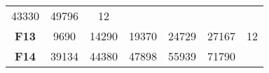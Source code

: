 \documentclass[12pt,a4paper]{article}
\begin{document}
\begin{longtable}[c]{@{}ccccccc@{}}
\begin{minipage}[t]{0.10\columnwidth}\centering\strut
43330
\strut\end{minipage} &
\begin{minipage}[t]{0.11\columnwidth}\centering\strut
49796
\strut\end{minipage} &
\begin{minipage}[t]{0.07\columnwidth}\centering\strut
12
\strut\end{minipage}\tabularnewline
\begin{minipage}[t]{0.11\columnwidth}\centering\strut
\textbf{F13}
\strut\end{minipage} &
\begin{minipage}[t]{0.08\columnwidth}\centering\strut
9690
\strut\end{minipage} &
\begin{minipage}[t]{0.08\columnwidth}\centering\strut
14290
\strut\end{minipage} &
\begin{minipage}[t]{0.09\columnwidth}\centering\strut
19370
\strut\end{minipage} &
\begin{minipage}[t]{0.10\columnwidth}\centering\strut
24729
\strut\end{minipage} &
\begin{minipage}[t]{0.11\columnwidth}\centering\strut
27167
\strut\end{minipage} &
\begin{minipage}[t]{0.07\columnwidth}\centering\strut
12
\strut\end{minipage}\tabularnewline
\begin{minipage}[t]{0.11\columnwidth}\centering\strut
\textbf{F14}
\strut\end{minipage} &
\begin{minipage}[t]{0.08\columnwidth}\centering\strut
39134
\strut\end{minipage} &
\begin{minipage}[t]{0.08\columnwidth}\centering\strut
44380
\strut\end{minipage} &
\begin{minipage}[t]{0.09\columnwidth}\centering\strut
47898
\strut\end{minipage} &
\begin{minipage}[t]{0.10\columnwidth}\centering\strut
55939
\strut\end{minipage} &
\begin{minipage}[t]{0.11\columnwidth}\centering\strut
71790
\strut\end{minipage} &

\end{longtable}
\end{document}
